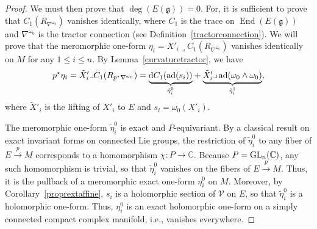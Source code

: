 \documentclass[pdftex]{sigma}
\numberwithin{equation}{section}
\begin{document}
\begin{proof}
We must then prove that $\deg (E(\mathfrak{g}))=0$. For, it is sufficient to prove that $C_1(R_{\nabla^{\omega_0}})$ vanishes identically, where $C_1$ is the trace on $\operatorname{End}(E(\mathfrak{g}))$ and $\nabla^{\omega_0}$ is the tractor connection (see Definition~\ref{tractorconnection}). We will prove that the meromorphic one-form $\eta_i = X'_i \lrcorner C_1(R_{\nabla^{\omega_0}})$ vanishes identically on $M$ for any $1\leq i\leq n$. By Lemma~\ref{curvaturetractor}, we have
 \begin{gather*}
 p^\star \eta_i = \tilde{X}'_i \lrcorner C_1(R_{p^\star \nabla^{\omega_0}}) = \underset{\tilde{\eta}_i^0}{\underbrace{{\rm d}C_1(\operatorname{ad}(s_i))}} + \underset{\tilde{\eta}^1_i}{\underbrace{\tilde{X}'_i \lrcorner \operatorname{ad}(\omega_0 \wedge \omega_0)}},\end{gather*}
 where $\tilde{X}'_i$ is the lifting of $X'_i$ to $E$ and $s_i = \omega_0(X'_i)$.

The meromorphic one-form $\tilde{\eta}^0_i$ is exact and $P$-equivariant. By a classical result on exact invariant forms on connected Lie groups, the restriction of $\tilde{\eta}^0_i$ to any fiber of $E\overset{p}{\longrightarrow} M$ corresponds to a homomorphism $\chi\colon P \longrightarrow \mathbb{C}$. Because $P={\rm GL}_n(\mathbb{C})$, any such homomorphism is trivial, so that $\tilde{\eta}^0_i$ vanishes on the fibers of $E\overset{p}{\longrightarrow} M$. Thus, it is the pullback of a meromorphic exact one-form $\eta^0_i$ on $M$. Moreover, by Corollary~\ref{proprextaffine}, $s_i$ is a holomorphic section of $\mathcal{V}$ on $E$, so that $\tilde{\eta}^0_i$ is a holomorphic one-form. Thus, $\eta^0_i$ is an exact holomorphic one-form on a simply connected compact complex manifold, i.e., vanishes everywhere.


\end{proof}
\end{document}
